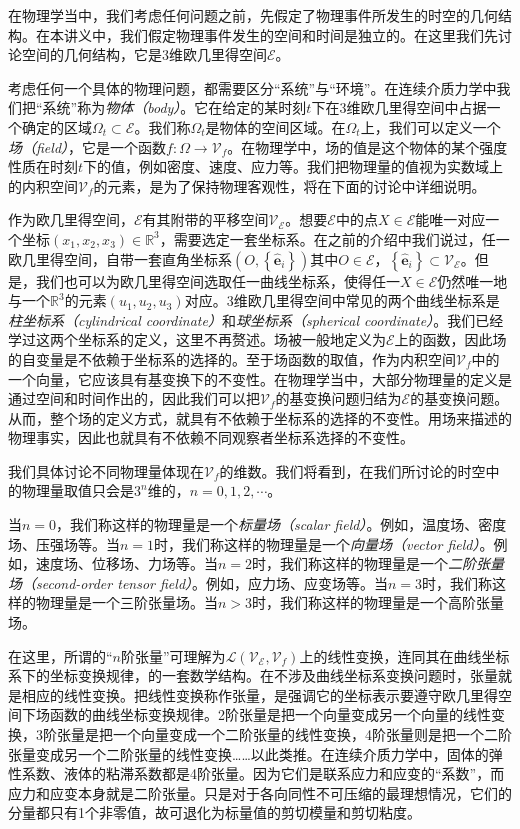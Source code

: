 \documentclass[../main.tex]{subfiles}
\begin{document}
在物理学当中，我们考虑任何问题之前，先假定了物理事件所发生的时空的几何结构。在本讲义中，我们假定物理事件发生的空间和时间是独立的。在这里我们先讨论空间的几何结构，它是3维欧几里得空间$\mathcal{E}$。

考虑任何一个具体的物理问题，都需要区分“系统”与“环境”。在连续介质力学中我们把“系统”称为\emph{物体（body）}。它在给定的某时刻$t$下在3维欧几里得空间中占据一个确定的区域$\Omega_t\subset\mathcal{E}$。我们称$\Omega_t$是物体的空间区域。在$\Omega_t$上，我们可以定义一个\emph{场（field）}，它是一个函数$f:\Omega\rightarrow\mathcal{V}_f$。在物理学中，场的值是这个物体的某个强度性质在时刻$t$下的值，例如密度、速度、应力等。我们把物理量的值视为实数域上的内积空间$\mathcal{V}_f$的元素，是为了保持物理客观性，将在下面的讨论中详细说明。

作为欧几里得空间，$\mathcal{E}$有其附带的平移空间$\mathcal{V}_{\mathcal{E}}$。想要$\mathcal{E}$中的点$X\in \mathcal{E}$能唯一对应一个坐标$\left(x_1,x_2,x_3\right)\in\mathbb{R}^3$，需要选定一套坐标系。在之前的介绍中我们说过，任一欧几里得空间，自带一套直角坐标系$\left(O,\left\{\mathbf{\hat{e}}_i\right\}\right)$其中$O\in\mathcal{E}$，$\left\{\mathbf{\hat{e}}_i\right\}\subset\mathcal{V}_{\mathcal{E}}$。但是，我们也可以为欧几里得空间选取任一曲线坐标系，使得任一$X\in\mathcal{E}$仍然唯一地与一个$\mathbb{R}^3$的元素$\left(u_1,u_2,u_3\right)$对应。3维欧几里得空间中常见的两个曲线坐标系是\emph{柱坐标系（cylindrical coordinate）}和\emph{球坐标系（spherical coordinate）}。我们已经学过这两个坐标系的定义，这里不再赘述。场被一般地定义为$\mathcal{E}$上的函数，因此场的自变量是不依赖于坐标系的选择的。至于场函数的取值，作为内积空间$\mathcal{V}_f$中的一个向量，它应该具有基变换下的不变性。在物理学当中，大部分物理量的定义是通过空间和时间作出的，因此我们可以把$\mathcal{V}_f$的基变换问题归结为$\mathcal{E}$的基变换问题。从而，整个场的定义方式，就具有不依赖于坐标系的选择的不变性。用场来描述的物理事实，因此也就具有不依赖不同观察者坐标系选择的不变性。

我们具体讨论不同物理量体现在$\mathcal{V}_f$的维数。我们将看到，在我们所讨论的时空中的物理量取值只会是$3^n$维的，$n=0,1,2,\cdots$。

当$n=0$，我们称这样的物理量是一个\emph{标量场（scalar field）}。例如，温度场、密度场、压强场等。当$n=1$时，我们称这样的物理量是一个\emph{向量场（vector field）}。例如，速度场、位移场、力场等。当$n=2$时，我们称这样的物理量是一个\emph{二阶张量场（second-order tensor field）}。例如，应力场、应变场等。当$n=3$时，我们称这样的物理量是一个三阶张量场。当$n>3$时，我们称这样的物理量是一个高阶张量场。

在这里，所谓的“$n$阶张量”可理解为$\mathcal{L}\left(\mathcal{V}_{\mathcal{E}},\mathcal{V}_f\right)$上的线性变换，连同其在曲线坐标系下的坐标变换规律，的一套数学结构。在不涉及曲线坐标系变换问题时，张量就是相应的线性变换。把线性变换称作张量，是强调它的坐标表示要遵守欧几里得空间下场函数的曲线坐标变换规律。2阶张量是把一个向量变成另一个向量的线性变换，3阶张量是把一个向量变成一个二阶张量的线性变换，4阶张量则是把一个二阶张量变成另一个二阶张量的线性变换……以此类推。在连续介质力学中，固体的弹性系数、液体的粘滞系数都是4阶张量。因为它们是联系应力和应变的“系数”，而应力和应变本身就是二阶张量。只是对于各向同性不可压缩的最理想情况，它们的分量都只有1个非零值，故可退化为标量值的剪切模量和剪切粘度。
\end{document}
